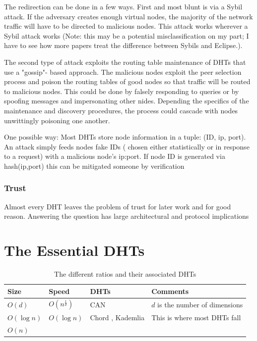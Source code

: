 \documentclass[10pt,letterpaper]{report}
\begin{document}
The redirection can be done in a few ways.  First and most blunt is via a Sybil attack.  If the adversary creates enough virtual nodes, the majority of the network traffic will have to be directed to malicious nodes.  This attack works wherever a Sybil attack works  (Note: this may be a potential  misclassification on my part; I have to see how more papers treat the difference between Sybils and Eclipse.).

The second type of attack exploits the routing table maintenance of DHTs that use a "gossip"- based approach.  The malicious nodes exploit the peer selection process and poison the routing tables of good nodes so that traffic will be routed to malicious nodes.  This could be done by falsely responding to queries or by spoofing messages and impersonating other nides.   Depending the specifics of  the maintenance and discovery procedures,  the process could cascade with nodes unwittingly poisoning one another.

One possible way:  Most DHTs store node information in a tuple: (ID, ip, port).  An attack simply feeds nodes fake IDs ( chosen either statistically or in response to a request) with a malicious node's ip:port.  If node ID is generated via hash(ip,port)  this can be mitigated someone by verification  


\subsection{Trust}
Almost every DHT leaves the problem of trust for later work and for good reason.
Answering the question has large architectural and protocol implications %


\chapter{The Essential DHTs}%


\begin{table}
  \centering
  \begin{tabular}{|l|l|l|l|}
  \hline
  Size & Speed & DHTs & Comments \\ \hline
  
  $O(d)$ & $O(n^{\frac{1}{d}})$ & CAN \cite{can} & $d$ is the number of dimensions \\ \hline
  
  $O(\log n)$ & $O(\log n)$ & Chord \cite{chord}, Kademlia \cite{kademlia} & This is where most DHTs fall \\ \hline
  
  $O(n)$ &  & & \\ \hline
  \end{tabular}
  \caption{The different ratios and their associated DHTs}
  \label{tab:tradeoffs}
\end{table}
\end{document}

